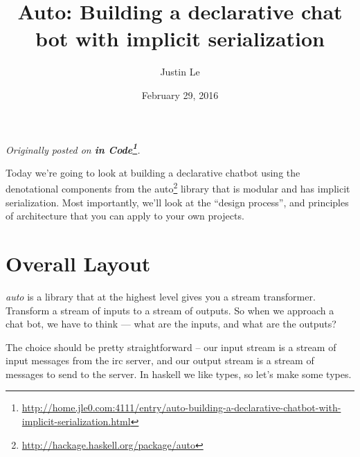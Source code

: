 \documentclass[]{article}
\title{Auto: Building a declarative chat bot with implicit serialization}
\author{Justin Le}
\date{February 29, 2016}
\renewcommand{\href}[2]{#2\footnote{\url{#1}}}
\begin{document}
\maketitle

\emph{Originally posted on
\textbf{\href{http://home.jle0.com:4111/entry/auto-building-a-declarative-chatbot-with-implicit-serialization.html}{in
Code}}.}

Today we're going to look at building a declarative chatbot using the
denotational components from the
\href{http://hackage.haskell.org/package/auto}{auto} library that is modular and
has implicit serialization. Most importantly, we'll look at the ``design
process'', and principles of architecture that you can apply to your own
projects.

\section{Overall Layout}\label{overall-layout}

\emph{auto} is a library that at the highest level gives you a stream
transformer. Transform a stream of inputs to a stream of outputs. So when we
approach a chat bot, we have to think --- what are the inputs, and what are the
outputs?

The choice should be pretty straightforward -- our input stream is a stream of
input messages from the irc server, and our output stream is a stream of
messages to send to the server. In haskell we like types, so let's make some
types.
\end{document}
